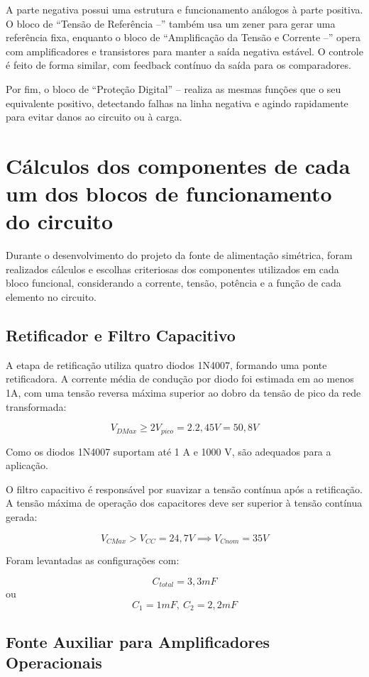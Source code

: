 \documentclass[
	12pt,				%
	oneside,			%
	a4paper,			%
	chapter=TITLE,
	sumario=tradicional,
	english,			%
	brazil				%
]{abntex2}
\begin{document}
A parte negativa possui uma estrutura e funcionamento análogos à parte positiva. O bloco de ``Tensão de Referência –'' também usa um zener para gerar uma referência fixa, enquanto o bloco de ``Amplificação da Tensão e Corrente –'' opera com amplificadores e transistores para manter a saída negativa estável. O controle é feito de forma similar, com feedback contínuo da saída para os comparadores.

Por fim, o bloco de ``Proteção Digital'' – realiza as mesmas funções que o seu equivalente positivo, detectando falhas na linha negativa e agindo rapidamente para evitar danos ao circuito ou à carga.



\chapter{Cálculos dos componentes de cada um dos blocos de funcionamento do circuito}\label{cap:calculo} 

Durante o desenvolvimento do projeto da fonte de alimentação simétrica, foram realizados cálculos e escolhas criteriosas dos componentes utilizados em cada bloco funcional, considerando a corrente, tensão, potência e a função de cada elemento no circuito.

\section{Retificador e Filtro Capacitivo}
A etapa de retificação utiliza quatro diodos 1N4007, formando uma ponte retificadora. A corrente média de condução por diodo foi estimada em ao menos 1A, com uma tensão reversa máxima superior ao dobro da tensão de pico da rede transformada:

$$V_{DMax} \geq 2V_{pico}=2.2,45V = 50,8V$$

Como os diodos 1N4007 suportam até 1 A e 1000 V, são adequados para a aplicação.

O filtro capacitivo é responsável por suavizar a tensão contínua após a retificação. A tensão máxima de operação dos capacitores deve ser superior à tensão contínua gerada:

$$V_{CMax} > V_{CC} = 24,7V \implies V_{C nom} = 35V$$

Foram levantadas as configurações com:

$$C_{total} = 3,3mF$$ ou $$C_{1} = 1mF,\ C_2=2,2mF$$

\section{Fonte Auxiliar para Amplificadores Operacionais}
\end{document}
